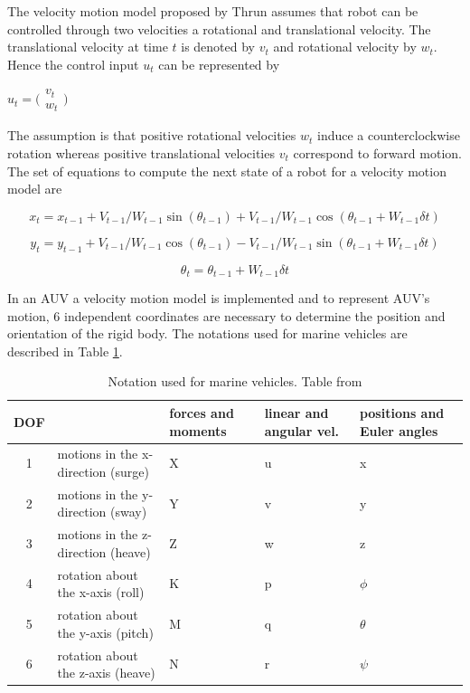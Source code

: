 \documentclass[12pt]{dalcsthesis}
\begin{document}
The velocity motion model proposed by Thrun \cite{thrun2005probabilistic} assumes that robot can be controlled through two velocities a rotational and translational velocity. The translational velocity at time $t$ is denoted by $v_{t}$ and rotational velocity by $w_{t}$. Hence the control input $u_{t}$ can be represented by  
\begin{center}
$u_{t}=\bigl(\begin{array}{c}
                v_{t} \\
                w_{t}
               \end{array}\bigr)$
  
\end{center}

The assumption is that positive rotational velocities $w_{t}$ induce a counterclockwise rotation whereas positive translational velocities $v_{t}$ correspond to forward motion. The set of equations to compute the next state of a robot for a velocity motion model are 

\begin{equation}
x_{t}=x_{t-1}+V_{t-1}/W_{t-1} \sin(\theta_{t-1})+ V_{t-1}/W_{t-1} \cos(\theta_{t-1} + W_{t-1} \delta t)
\end{equation}

\begin{equation}
y_{t}=y_{t-1}+V_{t-1}/W_{t-1} \cos(\theta_{t-1})- V_{t-1}/W_{t-1} \sin(\theta_{t-1} + W_{t-1} \delta t)
\end{equation}

\begin{equation}
\theta_{t}=\theta_{t-1}+ W_{t-1} \delta t
\end{equation}
 


In an AUV a velocity motion model is implemented and to represent AUV's motion, 6 independent coordinates are necessary to determine the position and orientation of the rigid body. The notations used for marine vehicles are described in Table \ref{marine notation}. 

\begin{table}[tbh]
\centering
\label{marine notation}
\begin{tabular}{|c|>{\centering}p{3cm}|>{\centering}p{3cm}|>{\centering}p{3cm}|>{\centering}p{3cm}|}
\hline 
DOF &  & forces and moments & linear and angular vel. & positions and Euler angles\tabularnewline
\hline 
\hline 
1 & motions in the x-direction (surge) & X & u & x\tabularnewline
\hline 
2 & motions in the y-direction (sway) & Y & v & y\tabularnewline
\hline 
3 & motions in the z-direction (heave) & Z & w & z\tabularnewline
\hline 
4 & rotation about the x-axis (roll) & K & p & $\phi$\tabularnewline
\hline 
5 & rotation about the y-axis (pitch) & M & q & $\theta$\tabularnewline
\hline 
6 & rotation about the z-axis (heave) & N & r & $\psi$\tabularnewline
\hline 
\end{tabular}
\caption{Notation used for marine vehicles. Table from \cite{Thor}}
\end{table}
\end{document}
